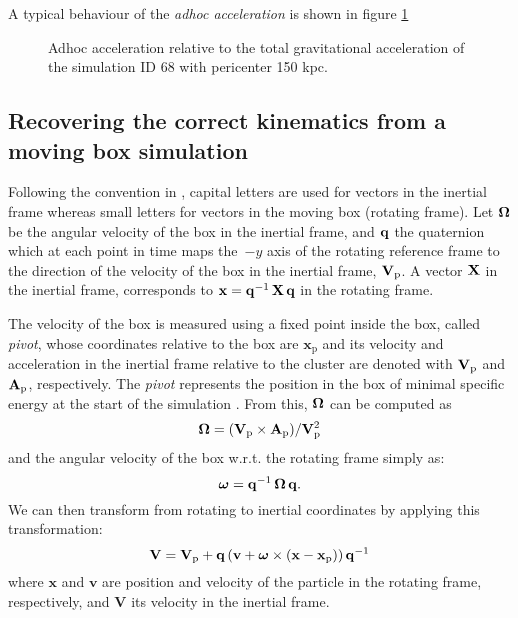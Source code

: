 A typical behaviour of the \emph{adhoc acceleration} is shown in figure \ref{fig:adhoc}

\begin{figure}
\centering
\caption{Adhoc acceleration relative to the total gravitational acceleration of the simulation ID 68 with pericenter 150 kpc.}
\label{fig:adhoc}
\end{figure}


\subsection{Recovering the correct kinematics from a moving box simulation}
\label{sec:corret_kinematics}
Following the convention in \citet{Nichols2015}, capital letters are used for vectors in the inertial frame whereas small letters for vectors in the moving box (rotating frame).
Let $\boldsymbol{\mathbf{\Omega}}$ be the angular velocity of the box in the inertial frame, and $\boldsymbol{\mathbf{q}}$ the quaternion which at each point in time maps the~$-y$ axis of the rotating reference frame to the direction of the velocity of the box in the inertial frame, $\mathbf{V}_{\mathrm p}$.
A vector $\boldsymbol{\mathbf{X}}$ in the inertial frame, corresponds to $\boldsymbol{\mathbf{x}} = \mathbf q^{-1}\, \boldsymbol{\mathbf{X}} \,\mathbf q $ in the rotating frame.

The velocity of the box is measured using a fixed point inside the box, called \emph{pivot}, whose coordinates relative to the box are $\mathbf{x}_{\mathrm p}$ and its velocity and acceleration in the inertial frame relative to the cluster are denoted with $\mathbf{V}_{\mathrm p}$ and $\mathbf{A}_{\mathrm p}$, respectively.
The \emph{pivot} represents the position in the box of minimal specific energy at the start of the simulation \citep{Hausammann2019}.
From this, $\boldsymbol{\mathbf{\Omega}}$ can be computed as 
\begin{equation}
 \boldsymbol{\mathbf{\Omega}} = {(\mathbf{V}_{\mathrm p}\times\mathbf{A}_{\mathrm p})}/{\mathbf{V}_{\mathrm p}^2}
\end{equation}
and the angular velocity of the box w.r.t. the rotating frame simply as:
\begin{equation}
\boldsymbol{\mathbf{\omega}} = \mathbf q^{-1}\, \boldsymbol{\mathbf{\Omega}}\, \mathbf q.
\end{equation}
We can then transform from rotating to inertial coordinates by applying this transformation:
\begin{equation}
\boldsymbol{\mathbf{V}} = \mathbf{V}_{\mathrm p} + \mathbf q \left(\mathbf v + \boldsymbol{\mathbf{\omega}} \times (\mathbf x-\mathbf x_{\mathrm p})\right) \mathbf q^{-1}
\end{equation}
where $\mathbf x$ and $\mathbf v$ are position and velocity of the particle in the rotating frame, respectively, and $\mathbf V$ its velocity in the inertial frame. %



